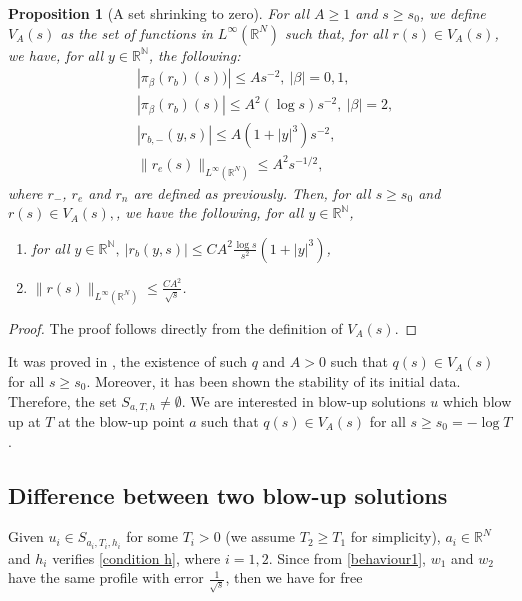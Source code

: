 \documentclass[11pt,a4paper]{article}
\newcommand{\1}{\mathbbm{1}}
\numberwithin{equation}{section}
\newcommand{\numberset}{\mathbb}
\newcommand{\N}{\numberset{N}}
\newcommand{\R}{\numberset{R}}
\newtheorem{prp}[lemma]{Proposition}
\theoremstyle{remark}
\begin{document}
\begin{prp}[A set shrinking to zero]\label{def V_A}
For all $A\geq 1$ and $s\geq s_0$, we define $V_A(s)$ as the set of functions in $L^\infty(\R^N)$ such that, for all $r(s)\in V_A(s)$, we have, for all $y\in \R^\N$, the following:
\begin{equation}
\begin{split}
&|\pi_\beta(r_b)(s))|\leq As^{-2},\ |\beta|=0,1,\\
&|\pi_\beta(r_b)(s)|\leq A^2(\log s) s^{-2},\ |\beta|=2,\\
&|r_{b,-}(y,s)|\leq A(1+|y|^3)s^{-2},\\
&\|r_e(s)\|_{L^\infty(\R^N)}\leq A^2s^{-1/2},
\end{split}
\end{equation}
where $r_-$, $r_e$ and $r_n$ are defined as previously. Then, for all $s\geq s_0$ and $r(s)\in V_A(s),$, we have the following, for all $y\in \R^\N$,
\begin{enumerate}[label=(\roman*)]
\item for all $y\in \R^\N, \ |r_b(y,s)|\leq CA^2\frac{\log s}{s^2}(1+|y|^3)$,\label{i}
\item $\|r(s)\|_{L^\infty(\R^N)}\leq \frac{CA^2}{\sqrt{s}}$.\label{ii}
\end{enumerate}
\end{prp}

\begin{proof}
The proof follows directly from the definition of $V_A(s)$.
\end{proof}



It was proved in \cite{EZ2011}, the existence of such $q$ and $A>0$ such that $q(s)\in V_A(s)$ for all $s\geq s_0$. Moreover, it has been shown the stability of its initial data. Therefore, the set $S_{a,T,h}\neq \emptyset$. We are interested in blow-up solutions $u$ which blow up at $T$ at the blow-up point $a$ such that $q(s)\in V_A(s)$ for all $s\geq s_0=-\log T$ .




\subsection{Difference between two blow-up solutions}
Given $u_i\in S_{a_i,T_i,h_i}$ for some $T_i>0$ (we assume $T_2\geq T_1$ for simplicity), $a_i\in \R^N$ and $h_i$ verifies \eqref{condition h}, where $i=1,2$. Since from \eqref{behaviour1}, $w_1$ and $w_2$ have the same profile with error $\frac{1}{\sqrt{s}}$, then we have for free 
\end{document}
